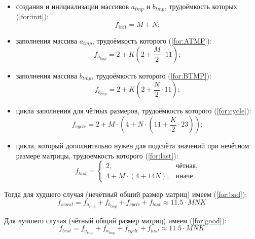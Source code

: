 \begin{itemize}
	\item создания и инициализации массивов $a_{tmp}$ и $b_{tmp}$, трудоёмкость которых (\ref{for:init}):
	\begin{equation}
		\label{for:init}
		f_{init} = M + N;
	\end{equation}

	\item заполнения массива $a_{tmp}$, трудоёмкость которого (\ref{for:ATMP}):
	\begin{equation}
		\label{for:ATMP}
		f_{a_{tmp}} = 2 + K (2 + \frac{M}{2} \cdot 11);
	\end{equation}

	\item заполнения массива $b_{tmp}$, трудоёмкость которого (\ref{for:BTMP}):
	\begin{equation}
		\label{for:BTMP}
		f_{b_{tmp}} = 2 + K (2 + \frac{N}{2} \cdot 11);
	\end{equation}

	\item цикла заполнения для чётных размеров, трудоёмкость которого (\ref{for:cycle}):
	\begin{equation}
		\label{for:cycle}
		f_{cycle} = 2 + M \cdot (4 + N \cdot (11 + \frac{K}{2} \cdot 23));
	\end{equation}

	\item цикла, который дополнительно нужен для подсчёта значений при нечётном размере матрицы, трудоемкость которого (\ref{for:last}):
	\begin{equation}
		\label{for:last}
		f_{last} = \begin{cases}
			2, & \text{чётная,}\\
			4 + M \cdot (4 + 14N), & \text{иначе.}
		\end{cases}
	\end{equation}
\end{itemize}

Тогда для худшего случая (нечётный общий размер матриц) имеем (\ref{for:bad}):
\begin{equation}
	\label{for:bad}
	f_{worst} =  f_{a_{tmp}} + f_{b_{tmp}} + f_{cycle} + f_{last}\approx 11.5 \cdot MNK
\end{equation}

Для лучшего случая (чётный общий размер матриц) имеем (\ref{for:good}):
\begin{equation}
	\label{for:good}
f_{best} =  f_{a_{tmp}} + f_{a_{tmp}} + f_{cycle} + f_{last} \approx 11.5 \cdot MNK
\end{equation}


